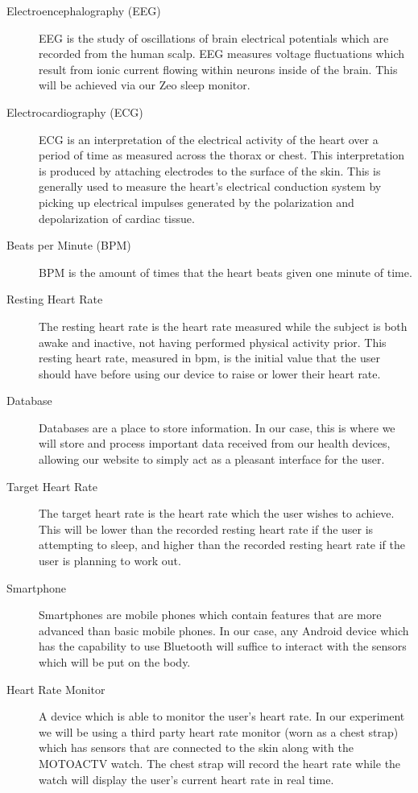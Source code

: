 \documentclass[letterpaper,english]{scrreprt}
\begin{document}
\begin{description}
	\item[Electroencephalography (EEG)] EEG is the study of oscillations of brain electrical potentials which are recorded from the human scalp. EEG measures voltage fluctuations which result from ionic current flowing within neurons inside of the brain. This will be achieved via our Zeo sleep monitor.
	\item[Electrocardiography (ECG)] ECG is an interpretation of the electrical activity of the heart over a period of time as measured across the thorax or chest. This interpretation is produced by attaching electrodes to the surface of the skin. This is generally used to measure the heart’s electrical conduction system by picking up electrical impulses generated by the polarization and depolarization of cardiac tissue.

	\item[Beats per Minute (BPM)] BPM is the amount of times that the heart beats given one minute of time.

	\item[Resting Heart Rate] The resting heart rate is the heart rate measured while the subject is both awake and inactive, not having performed physical activity prior. This resting heart rate, measured in bpm, is the initial value that the user should have before using our device to raise or lower their heart rate.

	\item[Database] Databases are a place to store information. In our case, this is where we will store and process important data received from our health devices, allowing our website to simply act as a pleasant interface for the user.

	\item[Target Heart Rate] The target heart rate is the heart rate which the user wishes to achieve. This will be lower than the recorded resting heart rate if the user is attempting to sleep, and higher than the recorded resting heart rate if the user is planning to work out.

	\item[Smartphone] Smartphones are mobile phones which contain features that are more advanced than basic mobile phones. In our case, any Android device which has the capability to use Bluetooth will suffice to interact with the sensors which will be put on the body.

	\item[Heart Rate Monitor] A device which is able to monitor the user’s heart rate. In our experiment we will be using a third party heart rate monitor (worn as a chest strap) which has sensors that are connected to the skin along with the MOTOACTV watch. The chest strap will record the heart rate while the watch will display the user’s current heart rate in real time.
\end{description}
\end{document}
